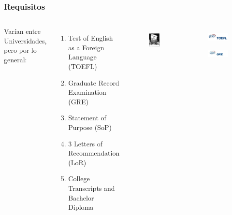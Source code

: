 \documentclass[10pt]{beamer}
\begin{document}
\begin{frame}
\frametitle{Requisitos}

\begin{columns}[t]

Varían entre Universidades, pero por lo general:

\begin{enumerate}
\item{Test of English as a Foreign Language (TOEFL)}
\item{Graduate Record Examination (GRE)}
\item{Statement of Purpose (SoP)}
\item{3 Letters of Recommendation (LoR)}
\item{College Transcripts and Bachelor Diploma}
\end{enumerate}

\begin{figure}
\includegraphics[scale=0.3]{figures/SoP_Logo.jpg} 	
	          \label{fig:SoPLogo}
	          \end{figure}
\begin{figure}[h]
			\centering

			  \includegraphics[scale=0.3]{figures/TOEFL_Logo.jpg} 
	          \label{fig:TOEFLLogo}             

	          \includegraphics[scale=0.6]{figures/GRE_Logo.jpg} 	
	          \label{fig:GRELogo}

            \label{fig:Requirements}
	\end{figure} 

\end{columns}

\end{frame}
\end{document}

